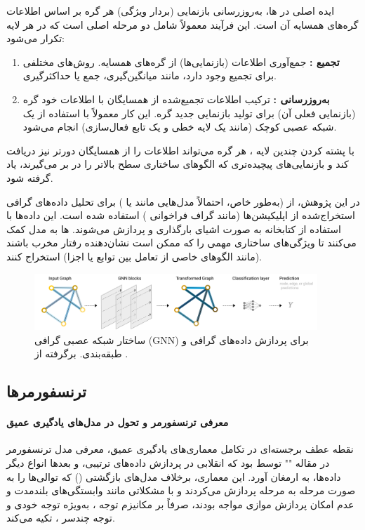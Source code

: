 ایده اصلی در ها، به‌روزرسانی بازنمایی (بردار ویژگی) هر گره بر اساس اطلاعات گره‌های همسایه آن است. این فرآیند معمولاً شامل دو مرحله اصلی است که در هر لایه  تکرار می‌شود:
\begin{enumerate}
    \item \textbf{تجمیع :} جمع‌آوری اطلاعات (بازنمایی‌ها) از گره‌های همسایه. روش‌های مختلفی برای تجمیع وجود دارد، مانند میانگین‌گیری، جمع یا حداکثرگیری.
    \item \textbf{به‌روزرسانی :} ترکیب اطلاعات تجمیع‌شده از همسایگان با اطلاعات خود گره (بازنمایی فعلی آن) برای تولید بازنمایی جدید گره. این کار معمولاً با استفاده از یک شبکه عصبی کوچک (مانند یک لایه خطی و یک تابع فعال‌سازی) انجام می‌شود.
\end{enumerate}
با پشته کردن چندین لایه ، هر گره می‌تواند اطلاعات را از همسایگان دورتر نیز دریافت کند و بازنمایی‌های پیچیده‌تری که الگوهای ساختاری سطح بالاتر را در بر می‌گیرند، یاد گرفته شود.

در این پژوهش، از  (به‌طور خاص، احتمالاً مدل‌هایی مانند  \cite{Kipf2017} یا  \cite{Velickovic2018}) برای تحلیل داده‌های گرافی استخراج‌شده از اپلیکیشن‌ها (مانند گراف فراخوانی ) استفاده شده است. این داده‌ها با استفاده از کتابخانه  به صورت اشیای  بارگذاری و پردازش می‌شوند. ها به مدل کمک می‌کنند تا ویژگی‌های ساختاری مهمی را که ممکن است نشان‌دهنده رفتار مخرب باشند (مانند الگوهای خاصی از تعامل بین توابع یا اجزا) استخراج کنند.

\begin{figure}[!t]
    \centering
    \includegraphics[width=0.95\textwidth]{images/gnn_structure}
    \caption{ساختار شبکه عصبی گرافی (GNN) برای پردازش داده‌های گرافی و طبقه‌بندی. برگرفته از \cite{sanchez-lengeling2021a}.}
    \label{fig:gnn_structure}
\end{figure}

\subsection{ترنسفورمرها}

\paragraph{معرفی ترنسفورمر و تحول در مدل‌های یادگیری عمیق}
نقطه عطف برجسته‌ای در تکامل معماری‌های یادگیری عمیق، معرفی مدل ترنسفورمر در مقاله "" توسط \textcite{attention} بود که انقلابی در پردازش داده‌های ترتیبی، و بعدها انواع دیگر داده‌ها، به ارمغان آورد. این معماری، برخلاف مدل‌های بازگشتی () که توالی‌ها را به صورت مرحله به مرحله پردازش می‌کردند و با مشکلاتی مانند وابستگی‌های بلندمدت و عدم امکان پردازش موازی مواجه بودند، صرفاً بر مکانیزم توجه ، به‌ویژه توجه خودی  و توجه چندسر ، تکیه می‌کند.

